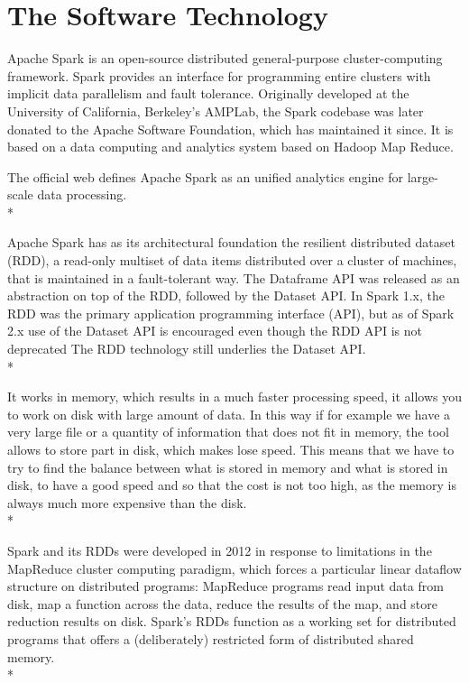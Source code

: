 \section{The Software Technology}
\label{sec:background}


Apache Spark is an open-source distributed general-purpose cluster-computing framework. Spark provides an interface for programming entire clusters with implicit data parallelism and fault tolerance. Originally developed at the University of California, Berkeley's AMPLab, the Spark codebase was later donated to the Apache Software Foundation, which has maintained it since. It is based on a data computing and analytics system based on Hadoop Map Reduce.

The official web defines Apache Spark as an unified analytics engine for large-scale data processing.\cite{sparkWebsite} \\*

Apache Spark has as its architectural foundation the resilient distributed dataset (RDD), a read-only multiset of data items distributed over a cluster of machines, that is maintained in a fault-tolerant way.\cite{brown:zaharia2010spark} The Dataframe API was released as an abstraction on top of the RDD, followed by the Dataset API. In Spark 1.x, the RDD was the primary application programming interface (API), but as of Spark 2.x use of the Dataset API is encouraged \cite{brown:eadline2015hadoop} even though the RDD API is not deprecated The RDD technology still underlies the Dataset API.\\*

It works in memory, which results in a much faster processing speed, it allows you to work on disk with large amount of data. In this way if for example we have a very large file or a quantity of information that does not fit in memory, the tool allows to store part in disk, which makes lose speed. This means that we have to try to find the balance between what is stored in memory and what is stored in disk, to have a good speed and so that the cost is not too high, as the memory is always much more expensive than the disk.\\*

Spark and its RDDs were developed in 2012 in response to limitations in the MapReduce cluster computing paradigm, which forces a particular linear dataflow structure on distributed programs: MapReduce programs read input data from disk, map a function across the data, reduce the results of the map, and store reduction results on disk. Spark's RDDs function as a working set for distributed programs that offers a (deliberately) restricted form of distributed shared memory.\cite{zaharia2012resilient} \\*

